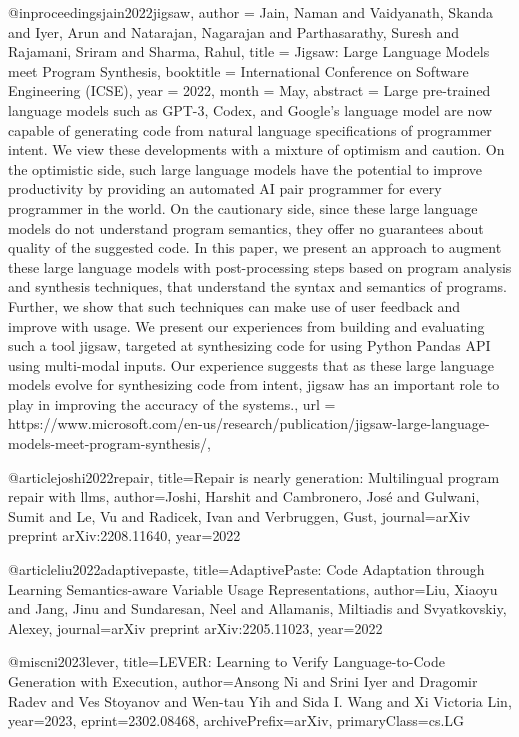 @inproceedings{jain2022jigsaw,
author = {Jain, Naman and Vaidyanath, Skanda and Iyer, Arun and Natarajan, Nagarajan and Parthasarathy, Suresh and Rajamani, Sriram and Sharma, Rahul},
title = {Jigsaw: Large Language Models meet Program Synthesis},
booktitle = {International Conference on Software Engineering (ICSE)},
year = {2022},
month = {May},
abstract = {Large pre-trained language models such as GPT-3, Codex, and Google's language model are now capable of generating code from natural language specifications of programmer intent. We view these developments with a mixture of optimism and caution. On the optimistic side, such large language models have the potential to improve productivity by providing an automated AI pair programmer for every programmer in the world. On the cautionary side, since these large language models do not understand program semantics, they offer no guarantees about quality of the suggested code. In this paper, we present an approach to augment these large language models with post-processing steps based on program analysis and synthesis techniques, that understand the syntax and semantics of programs. Further, we show that such techniques can make use of user feedback and improve with usage. We present our experiences from building and evaluating such a tool jigsaw, targeted at synthesizing code for using Python Pandas API using multi-modal inputs. Our experience suggests that as these large language models evolve for synthesizing code from intent, jigsaw has an important role to play in improving the accuracy of the systems.},
url = {https://www.microsoft.com/en-us/research/publication/jigsaw-large-language-models-meet-program-synthesis/},
}

@article{joshi2022repair,
  title={Repair is nearly generation: Multilingual program repair with llms},
  author={Joshi, Harshit and Cambronero, Jos{\'e} and Gulwani, Sumit and Le, Vu and Radicek, Ivan and Verbruggen, Gust},
  journal={arXiv preprint arXiv:2208.11640},
  year={2022}
}

@article{liu2022adaptivepaste,
  title={AdaptivePaste: Code Adaptation through Learning Semantics-aware Variable Usage Representations},
  author={Liu, Xiaoyu and Jang, Jinu and Sundaresan, Neel and Allamanis, Miltiadis and Svyatkovskiy, Alexey},
  journal={arXiv preprint arXiv:2205.11023},
  year={2022}
}

@misc{ni2023lever,
      title={LEVER: Learning to Verify Language-to-Code Generation with Execution}, 
      author={Ansong Ni and Srini Iyer and Dragomir Radev and Ves Stoyanov and Wen-tau Yih and Sida I. Wang and Xi Victoria Lin},
      year={2023},
      eprint={2302.08468},
      archivePrefix={arXiv},
      primaryClass={cs.LG}
}

